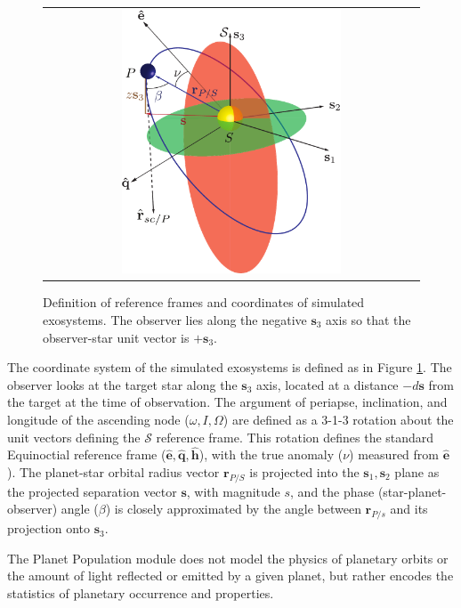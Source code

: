 \documentclass[cleanfoot]{asme2ej}
\def\mf{\mathbf}
\newcommand{\mfhat}[1]{\mf{\hat{#1}}}
\newcommand{\reffig}[1]{Figure \ref{#1}}
\begin{document}
\begin{figure}[ht]
    \begin{center}
        \begin{tabular}{c}
             \includegraphics[width=0.6\textwidth]{orbit_diagram}
        \end{tabular}
    \end{center}
    \caption{\label{fig:orbit_diagram} Definition of reference frames and coordinates of simulated exosystems.  The observer lies along the negative $\mf s_3$ axis so that the observer-star unit vector is $+\mf s_3$.}
\end{figure}

The coordinate system of the simulated exosystems is defined as in \reffig{fig:orbit_diagram}.  The observer looks at the target star along the $\mathbf{s}_3$ axis, located at a distance $-d\mathbf{s}$ from the target at the time of observation. The argument of periapse, inclination,  and longitude of the ascending node ($\omega, I, \Omega$) are defined as a 3-1-3 rotation about the unit vectors defining the $\mathcal{S}$ reference frame.  This rotation defines the standard Equinoctial reference frame ($\mfhat{e}, \mfhat{q}, \mfhat{h}$), with the true anomaly ($\nu$) measured from $\mfhat{e}$).  The planet-star orbital radius vector $\mf r_{P/S}$ is projected into the $\mf s_1, \mf s_2$ plane as the projected separation vector $\mf s$, with magnitude $s$, and the phase (star-planet-observer) angle ($\beta$) is closely approximated by the angle between $\mf r_{P/s}$ and its projection onto $\mf s_3$.

The Planet Population module does not model the physics of planetary orbits or the amount of light reflected or emitted by a given planet, but rather encodes the statistics of planetary occurrence and properties. 
\end{document}
